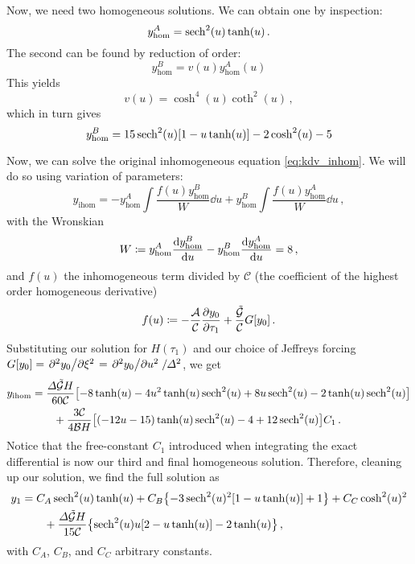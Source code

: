 \documentclass{jfm}
\begin{document}
Now, we need two homogeneous solutions.
We can obtain one by inspection:
\begin{equation}
  y^A_{\text{hom}} =
    \sech^2(u) \tanh(u) \,.
\end{equation}
The second can be found by reduction of order:
\begin{equation}
  y^B_{\text{hom}} = v(u) y^A_{\text{hom}}(u)
\end{equation}
This yields
\begin{equation}
  v(u) = \cosh^4(u) \coth^2(u) \,,
\end{equation}
which in turn gives
\begin{equation}
  y^B_{\text{hom}} = 15 \sech^2(u) \bqty{1-u \tanh(u)}-2 \cosh^2(u)-5
\end{equation}

Now, we can solve the original inhomogeneous equation
\cref{eq:kdv_inhom}.
We will do so using variation of parameters:
\begin{equation}
  y_{\text{ihom}} =
  -y^A_{\text{hom}} \int \frac{f(u) y^B_{\text{hom}}}{W} \dd{u}
  +y^B_{\text{hom}} \int \frac{f(u) y^A_{\text{hom}}}{W} \dd{u} \,,
\end{equation}
with the Wronskian
\begin{equation}
  W \coloneqq
    y^A_{\text{hom}} \dv{y^B_{\text{hom}}}{u}
    -y^B_{\text{hom}} \dv{y^A_{\text{hom}}}{u}
    = 8 \,,
\end{equation}
and $f(u)$ the inhomogeneous term divided by $\mathcal{C}$ (the
coefficient of the highest order homogeneous derivative)
\begin{equation}
  f(u) \coloneqq -\frac{\mathcal{A}}{\mathcal{C}} \pdv{y_0}{\tau_1}
    + \frac{\mathcal{\tilde{G}}}{\mathcal{C}} G[y_0] \,.
\end{equation}
Substituting our solution for $H(\tau_1)$ and our choice of Jeffreys
forcing $G[y_0] = \pdv*[2]{y_0}{\xi} = \pdv*[2]{y_0}{u}/\varDelta^2$, we
get
\begin{equation}
  \begin{split}
  y_{\text{ihom}} &=
  \frac{\Delta \mathcal{\tilde{G}} H}{60 \mathcal{C}}
  \bqty{-8\tanh(u)- 4 u^2 \tanh(u)\sech^2(u) +8 u
  \sech^2(u)-2\tanh(u)\sech^2(u)} \\
  &\qquad
  +\frac{3 \mathcal{C}}{4 \mathcal{B} H}
  \bqty{(-12u -15)\tanh(u)\sech^2(u) -4 +12\sech^2(u)} C_1 \,.
\end{split}
\end{equation}
Notice that the free-constant $C_1$ introduced when integrating the exact
differential is now our third and final homogeneous solution.
Therefore, cleaning up our solution, we find the full solution as
\begin{equation}
  \begin{split}
  y_1 &=
  C_A \sech^2(u) \tanh(u)
  +C_B \Bqty{-3\sech^2(u)^2 \bqty{1-u \tanh(u)}+1}
  +C_C \cosh^2(u)^2
  \\
  &\qquad
  + \frac{\Delta \mathcal{\tilde{G}} H}{15 \mathcal{C}}
  \Bqty{\sech^2(u) u \bqty{2-u\tanh(u)}-2\tanh(u)} \,,
  \end{split}
\end{equation}
with $C_A$, $C_B$, and $C_C$ arbitrary constants.
\end{document}
